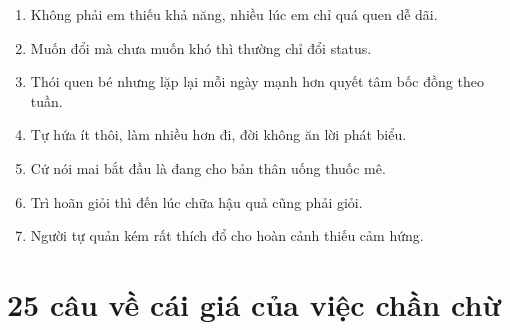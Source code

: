 \begin{enumerate}[leftmargin=*]
\item Không phải em thiếu khả năng, nhiều lúc em chỉ quá quen dễ dãi.
\item Muốn đổi mà chưa muốn khó thì thường chỉ đổi status.
\item Thói quen bé nhưng lặp lại mỗi ngày mạnh hơn quyết tâm bốc đồng theo tuần.
\item Tự hứa ít thôi, làm nhiều hơn đi, đời không ăn lời phát biểu.
\item Cứ nói mai bắt đầu là đang cho bản thân uống thuốc mê.
\item Trì hoãn giỏi thì đến lúc chữa hậu quả cũng phải giỏi.
\item Người tự quản kém rất thích đổ cho hoàn cảnh thiếu cảm hứng.
\end{enumerate}

\section{25 câu về cái giá của việc chần chừ}
